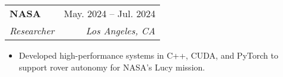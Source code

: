 \documentclass[letterpaper,11pt]{article}
\makeatletter
\newcommand{\resumeItem}[1]{
  \item\small{
    {#1 \vspace{-2pt}}
  }
}
\newcommand{\resumeSubheading}[4]{
  \vspace{-2pt}\item
    \begin{tabular*}{0.97\textwidth}[t]{l@{\extracolsep{\fill}}r}
      \textbf{#1} & #2 \\
      \textit{#3} & \textit{#4} \\
    \end{tabular*}\vspace{-7pt}
}
\newcommand{\resumeItemListStart}{\begin{itemize}}
\newcommand{\resumeItemListEnd}{\end{itemize}\vspace{-5pt}}
\makeatother
\begin{document}
    \resumeSubheading
      {NASA}{May. 2024 -- Jul. 2024}
      {Researcher}{Los Angeles, CA}
      \resumeItemListStart
        \resumeItem{Developed high-performance systems in C++, CUDA, and PyTorch to support rover autonomy for NASA's Lucy mission.}
      \resumeItemListEnd

    

        
        
        
\end{document}
